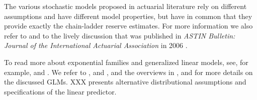\documentclass[]{book}
\begin{document}
The various stochastic models proposed in actuarial literature rely on
different assumptions and have different model properties, but have in
common that they provide exactly the chain-ladder reserve estimates. For
more information we also refer to \citet{MackVenter2000} and to the
lively discussion that was published in \emph{ASTIN Bulletin: Journal of
the International Actuarial Association} in 2006 \citep{Venter2006}.

To read more about exponential families and generalized linear models,
see, for example, \citet{McCullagh1989} and \citet{WuthrichMerz2008}. We
refer to \citep{Kremer1982}, \citep{RenshawVerrall1998} and
\citep{EnglandVerrall2002}, and the overviews in \citep{Taylor2000},
\citep{WuthrichMerz2008} and \citep{WuthrichMerz2015} for more details
on the discussed GLMs. XXX presents alternative distributional
assumptions and specifications of the linear predictor.


\end{document}
